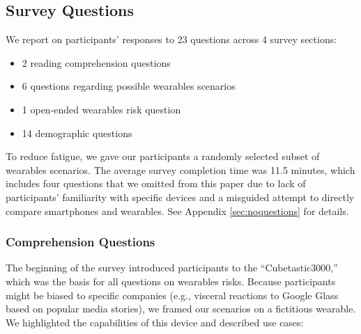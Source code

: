 \documentclass{sig-alternate-hotpets15}
\begin{document}
\subsection{Survey Questions}
\noindent We report on participants' responses to 23 questions across 4 survey sections:  \\[-.5cm]

\begin{itemize} \itemsep1pt \parskip0pt 
\item 2 reading comprehension questions
\item 6 questions regarding possible wearables scenarios
\item 1 open-ended wearables risk question
\item 14 demographic questions %
\end{itemize}

To reduce fatigue, we gave our participants a randomly selected subset of wearables scenarios. The average survey completion time was 11.5 minutes, which includes four questions that we omitted from this paper due to lack of participants' familiarity with specific devices and a misguided attempt to directly compare smartphones and wearables. See Appendix \ref{sec:noquestions} for details.

\subsubsection{Comprehension Questions}
The beginning of the survey introduced participants to the ``Cubetastic3000,'' which was the basis for all questions on wearables risks. Because participants might be biased to specific companies (e.g., visceral reactions to Google Glass based on popular media stories), we framed our scenarios on a fictitious wearable. We highlighted the capabilities of this device and described use cases:
\end{document}
